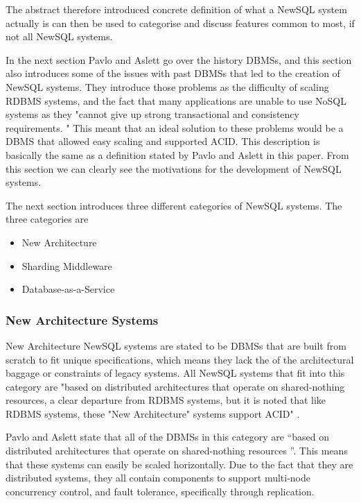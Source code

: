 \documentclass[10pt, conference]{IEEEtran}
\begin{document}
The abstract therefore introduced concrete definition of what a NewSQL system actually is can then be used to categorise and discuss features common to most, if not all NewSQL systems.

In the next section Pavlo and Aslett go over the history DBMSs, and this section also introduces some of the issues with past DBMSs that led to the creation of NewSQL systems. They introduce those problems as the difficulty of scaling RDBMS systems, and the fact that many applications are unable to use NoSQL systems as they "cannot give up strong transactional and consistency requirements.  \cite{pavlo}" This meant that an ideal solution to these problems would be a DBMS that allowed easy scaling and supported ACID. This description is basically the same as a definition stated by Pavlo and Aslett in this paper. From this section we can clearly see the motivations for the development of NewSQL systems.

The next section introduces three different categories of NewSQL systems. The three categories are

\begin{itemize}
	\item{New Architecture}
	\item{Sharding Middleware}
	\item{Database-as-a-Service}
\end{itemize}

\subsubsection{New Architecture Systems}

New Architecture NewSQL systems are stated to be DBMSs that are built from scratch to fit unique specifications, which means they lack the of the architectural baggage or constraints of legacy systems. All NewSQL systems that fit into this category are "based on distributed architectures that operate on shared-nothing resources, a clear departure from RDBMS systems, but it is noted that like RDBMS systems, these "New Architecture" systems support ACID"  \cite{pavlo}.

Pavlo and Aslett state that all of the DBMSs in this category are ``based on distributed architectures that operate on shared-nothing resources \cite{pavlo}''. This means that these systems can easily be scaled horizontally. Due to the fact that they are distributed systems, they all contain components to support multi-node concurrency control, and fault tolerance, specifically through replication.
\end{document}
